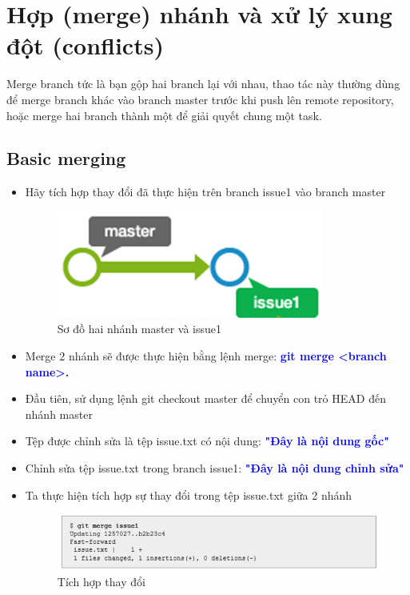 \documentclass[12pt,a4paper]{report}
\begin{document}
\section{Hợp (merge) nhánh và xử lý xung đột (conflicts)}

Merge branch tức là bạn gộp hai branch lại với nhau, thao tác này thường dùng để merge branch khác vào branch master trước khi push lên remote repository, hoặc merge hai branch thành một để giải quyết chung một task.	
\subsection{Basic merging}
\begin{itemize}
 \item Hãy tích hợp thay đổi đã thực hiện trên branch issue1 vào branch master

\begin{figure}[!ht]
	\centering
	\includegraphics[width=0.4\linewidth]{screenshot060}
\caption{Sơ đồ hai nhánh master và issue1}
	\label{fig:screenshot060}	
\end{figure}

\item Merge 2 nhánh sẽ được thực hiện bằng lệnh merge: \textcolor{blue}{\bf git merge <branch name>.}
\item Đầu tiên, sử dụng lệnh git checkout master để chuyển con trỏ HEAD đến nhánh master	

\item Tệp được chỉnh sửa là tệp issue.txt có nội dung: \textcolor{blue}{\bf "Đây là nội dung gốc"}	
\item Chỉnh sửa tệp issue.txt trong branch issue1: \textcolor{blue}{\bf "Đây là nội dung chỉnh sửa"}
\item Ta thực hiện tích hợp sự thay đổi trong tệp issue.txt giữa 2 nhánh

\begin{figure}[!ht]
	\centering	
	\includegraphics[width=0.8\linewidth]{screenshot01}
\caption{Tích hợp thay đổi}
	\label{fig:screenshot01}
\end{figure}


\end{itemize}
\end{document}
